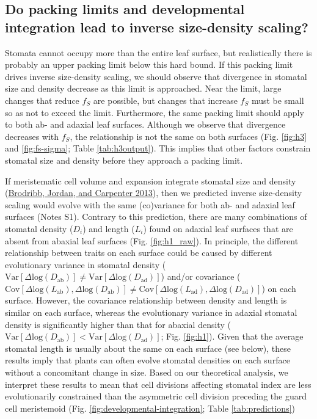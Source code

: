 \documentclass[
  12pt,
]{article}
\begin{document}
\hypertarget{do-packing-limits-and-developmental-integration-lead-to-inverse-size-density-scaling}{%
\subsection{Do packing limits and developmental integration lead to inverse size-density scaling?}\label{do-packing-limits-and-developmental-integration-lead-to-inverse-size-density-scaling}}

Stomata cannot occupy more than the entire leaf surface, but realistically there is probably an upper packing limit below this hard bound. If this packing limit drives inverse size-density scaling, we should observe that divergence in stomatal size and density decrease as this limit is approached. Near the limit, large changes that reduce \(f_S\) are possible, but changes that increase \(f_S\) must be small so as not to exceed the limit. Furthermore, the same packing limit should apply to both ab- and adaxial leaf surfaces. Although we observe that divergence decreases with \(f_S\), the relationship is not the same on both surfaces (Fig. \ref{fig:h3} and \ref{fig:fs-sigma}; Table \ref{tab:h3output}). This implies that other factors constrain stomatal size and density before they approach a packing limit.

If meristematic cell volume and expansion integrate stomatal size and density (\protect\hyperlink{ref-brodribb_unified_2013}{Brodribb, Jordan, and Carpenter 2013}), then we predicted inverse size-density scaling would evolve with the same (co)variance for both ab- and adaxial leaf surfaces (Notes S1). Contrary to this prediction, there are many combinations of stomatal density (\(D_i\)) and length (\(L_i\)) found on adaxial leaf surfaces that are absent from abaxial leaf surfaces (Fig. \ref{fig:h1_raw}). In principle, the different relationship between traits on each surface could be caused by different evolutionary variance in stomatal density (\(\text{Var}[\Delta \text{log}(D_\text{ab})] \ne \text{Var}[\Delta \text{log}(D_\text{ad})]\)) and/or covariance (\(\text{Cov}[\Delta \text{log}(L_\text{ab}), \Delta \text{log}(D_\text{ab})] \ne \text{Cov}[\Delta \text{log}(L_\text{ad}), \Delta \text{log}(D_\text{ad})]\)) on each surface. However, the covariance relationship between density and length is similar on each surface, whereas the evolutionary variance in adaxial stomatal density is significantly higher than that for abaxial density (\(\text{Var}[\Delta \text{log}(D_\text{ab})] < \text{Var}[\Delta \text{log}(D_\text{ad})]\); Fig. \ref{fig:h1}). Given that the average stomatal length is usually about the same on each surface (see below), these results imply that plants can often evolve stomatal densities on each surface without a concomitant change in size. Based on our theoretical analysis, we interpret these results to mean that cell divisions affecting stomatal index are less evolutionarily constrained than the asymmetric cell division preceding the guard cell meristemoid (Fig. \ref{fig:developmental-integration}; Table \ref{tab:predictions})
\end{document}
